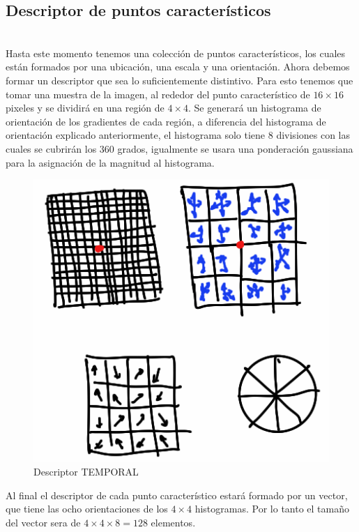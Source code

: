 	
	\subsection{Descriptor de puntos característicos} \hfill \\
	Hasta este momento tenemos una colección de puntos característicos, los cuales están formados por una ubicación, una escala y una orientación. Ahora debemos formar un descriptor que sea lo suficientemente distintivo. Para esto tenemos que tomar una muestra de la imagen, al rededor del punto característico de $16\times16$ pixeles y se dividirá en una región de $4 \times 4$. Se generará un histograma de orientación de los gradientes de cada región, a diferencia del histograma de orientación explicado anteriormente, el histograma solo tiene 8 divisiones con las cuales se cubrirán los 360 grados, igualmente se usara una ponderación gaussiana para la asignación de la magnitud al histograma.
		\begin{figure}[t]
			\centering
				\includegraphics[scale=0.5]{img/Descriptor.png}
			\caption{Descriptor TEMPORAL}
		\end{figure}
	Al final el descriptor de cada punto característico estará formado por un vector, que tiene las ocho orientaciones de los $4\times4$ histogramas. Por lo tanto el tamaño del vector sera de $4\times4\times8 = 128$ elementos. 
 
 
 







